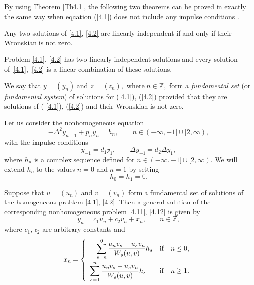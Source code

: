 \documentclass[pdftex]{sigma}
\numberwithin{equation}{section}
\begin{document}
By using Theorem \ref{Th4.1}, the following two theorems can be proved in
exactly the same way when equation (\ref{4.1}) does not include any impulse
conditions \cite{[6]}.

\begin{theorem}
\label{Th4.5}Any two solutions of \eqref{4.1}, \eqref{4.2} are linearly
independent if and only if their Wronskian is not zero.
\end{theorem}

\begin{theorem}
\label{Th4.6}Problem \eqref{4.1}, \eqref{4.2} has two linearly independent
solutions and every solution of~\eqref{4.1},~\eqref{4.2} is a linear
combination of these solutions.
\end{theorem}

We say that $y=(y_{n})$ and $z=(z_{n}),$ where $n\in
\mathbb{Z}
,$ form a \textit{fundamental set }(or \textit{fundamental system}) of
solutions for (\ref{4.1}), (\ref{4.2}) provided that they are solutions of (%
\ref{4.1}), (\ref{4.2}) and their Wronskian is not zero.

Let us consider the nonhomogeneous equation%
\begin{equation}
-\Delta ^{2}y_{n-1}+p_{n}y_{n}=h_{n},\qquad n\in (-\infty ,-1]\cup
\lbrack 2,\infty ),  \label{4.11}
\end{equation}%
with the impulse conditions%
\begin{equation}
y_{-1}=d_{1}y_{1},\qquad \Delta y_{-1}=d_{2}\Delta y_{1},  \label{4.12}
\end{equation}%
where $h_{n}$ is a complex sequence def\/ined for $n\in (-\infty ,-1]\cup
\lbrack 2,\infty ).$ We will extend $h_{n}$ to the values $n=0$ and $n=1$ by
setting%
\begin{equation}
h_{0}=h_{1}=0.  \label{4.13}
\end{equation}

\begin{theorem}
\label{Th4.7}Suppose that $u=(u_{n})$ and $v=(v_{n})$ form a fundamental set
of solutions of the homogeneous problem \eqref{4.1}, \eqref{4.2}. Then a
general solution of the corresponding nonhomogeneous problem \eqref{4.11}, \eqref{4.12} is given by%
\[
y_{n}=c_{1}u_{n}+c_{2}v_{n}+x_{n},\qquad n\in
\mathbb{Z},
\]%
where $c_{1}$, $c_{2}$ are arbitrary constants and%
\begin{equation}
x_{n}=\left\{
\begin{array}{lll}
\displaystyle -\sum_{s=n}^{0}\frac{u_{n}v_{s}-u_{s}v_{n}}{W_{s}(u,v)}h_{s} & \text{if} &
n\leq 0, \vspace{1mm} \\
\displaystyle \sum_{s=1}^{n}\frac{u_{n}v_{s}-u_{s}v_{n}}{W_{s}(u,v)}h_{s} & \text{if} &
n\geq 1.%
\end{array}%
\right.  \label{4.14}
\end{equation}
\end{theorem}
\end{document}
